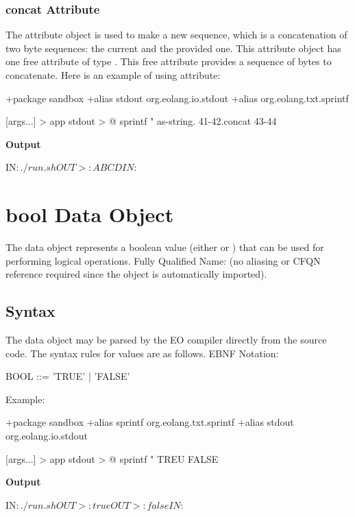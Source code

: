 \documentclass[12pt]{book}
\begin{document}
{\subsubsection{concat Attribute}
The  attribute object is used to make a new sequence, which is a concatenation of two byte sequences: the current and the provided one. This attribute object has one free attribute of type . This free attribute provides a sequence of bytes to concatenate. Here is an example of using  attribute:

\begin{ffcode}
+package sandbox
+alias stdout org.eolang.io.stdout
+alias org.eolang.txt.sprintf

[args...] > app
  stdout > @
    sprintf
      "%
      as-string.
        41-42.concat 43-44
\end{ffcode}
\textbf{Output}
\begin{ffcode}
IN$: ./run.sh
OUT>: ABCD
IN$: 
\end{ffcode}

\section{bool Data Object}
The  data object represents a boolean value (either  or ) that can be used for performing logical operations.
Fully Qualified Name:  (no aliasing or CFQN reference required since the object is automatically imported).

\subsection{Syntax}
The  data object may be parsed by the EO compiler directly from the source code. The syntax rules for  values are as follows. EBNF Notation:
\begin{ffcode}
BOOL     ::= 'TRUE'
           | 'FALSE'
\end{ffcode}
Example:
\begin{ffcode}
+package sandbox
+alias sprintf org.eolang.txt.sprintf
+alias stdout org.eolang.io.stdout

[args...] > app
  stdout > @
    sprintf
      "%
      TREU
      FALSE
\end{ffcode}
\textbf{Output}
\begin{ffcode}
IN$: ./run.sh
OUT>: true
OUT>: false
IN$: 
\end{ffcode}

}
\end{document}
